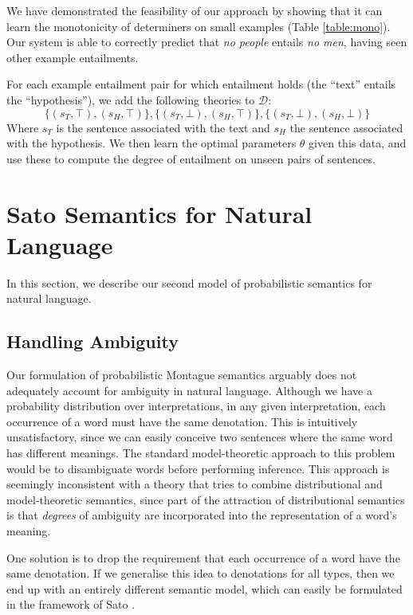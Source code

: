 \documentclass{svmult}
\begin{document}
We have demonstrated the feasibility of our approach by showing that
it can learn the monotonicity of determiners on small examples (Table
\ref{table:mono}). Our system is able to correctly predict that
\emph{no people} entails \emph{no men}, having seen other example
entailments.

For each example entailment pair for which entailment holds (the
``text'' entails the ``hypothesis''), we add
the following theories to $\mathcal{D}$:
\[
\{(s_T,\top),(s_H,\top)\}, \{(s_T,\bot),(s_H,\top)\},\{(s_T,\bot),(s_H,\bot)\}
\]
Where $s_T$ is the sentence associated with the text and $s_H$ the
sentence associated with the hypothesis. We then learn the optimal
parameters $\theta$ given this data, and use these to compute the
degree of entailment on unseen pairs of sentences.

\section{Sato Semantics for Natural Language}

In this section, we describe our second model of probabilistic
semantics for natural language.

\subsection{Handling Ambiguity}

Our formulation of probabilistic Montague semantics arguably does not
adequately account for ambiguity in natural language. Although we have
a probability distribution over interpretations, in any given
interpretation, each occurrence of a word must have the same
denotation. This is intuitively unsatisfactory, since we can easily
conceive two sentences where the same word has different meanings. The
standard model-theoretic approach to this problem would be to
disambiguate words before performing inference. This approach is
seemingly inconsistent with a theory that tries to combine
distributional and model-theoretic semantics, since part of the
attraction of distributional semantics is that \emph{degrees} of
ambiguity are incorporated into the representation of a word's
meaning.

One solution is to drop the requirement that each occurrence of a word
have the same denotation. If we generalise this idea to denotations
for all types, then we end up with an entirely different semantic
model, which can easily be formulated in the framework of Sato
\cite{Sato:97}.
\end{document}
